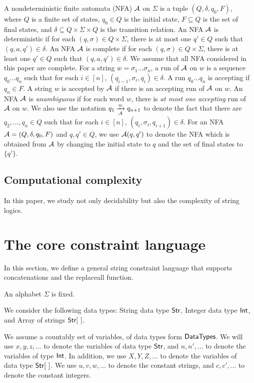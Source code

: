 A nondeterministic finite automata (NFA) $\mathcal{A}$ on $\Sigma$ is a tuple $(Q, \delta, q_0, F)$, where $Q$ is a finite set of states, $q_0 \in Q$ is the initial state, $F \subseteq Q$ is the set of final states, and $\delta \subseteq Q \times \Sigma \times Q$ is the transition relation. An NFA $\mathcal{A}$ is deterministic if for each $(q, \sigma) \in Q \times \Sigma$, there is at most one $q' \in Q$ such that $(q, a, q') \in \delta$. An NFA $\mathcal{A}$ is complete if for each $(q, \sigma) \in Q \times \Sigma$, there is at least one $q' \in Q$ such that $(q, a, q') \in \delta$. We assume that all NFA considered in this paper are complete. For a string $w = \sigma_1 \dots \sigma_n$, a run of $\mathcal{A}$ on $w$ is a sequence $q_0 \dots q_n$ such that for each $i \in [n]$, $(q_{i-1}, \sigma_i, q_i) \in \delta$. A run $q_0 \dots q_n$ is accepting if $q_n \in F$. A string $w$ is accepted by $\mathcal{A}$ if there is an accepting run of $\mathcal{A}$ on $w$. An NFA $\mathcal{A}$ is \emph{unambiguous} if for each word $w$, there is \emph{at most one accepting} run of $\mathcal{A}$ on $w$.
We also use the notation $q_1 \xrightarrow[\mathcal{A}]{w} q_{n+1}$ to denote the fact that there are $q_2,\dots, q_n \in Q$ such that for each $i \in [n]$, $(q_i, \sigma_i, q_{i+1}) \in \delta$.  For an NFA $\mathcal{A}=(Q, \delta, q_0, F)$ and $q, q' \in Q$, we use $\mathcal{A}(q,q')$ to denote the NFA which is obtained from $\mathcal{A}$ by changing the initial state to $q$ and the set of final states to $\{q'\}$.

\subsection*{Computational complexity}
In this paper, we study not only decidability but also the complexity of string logics. 


\section{The core constraint language}

In this section, we define a general string constraint language that supports concatenations and the replaceall function.  

An alphabet $\Sigma$ is fixed.

We consider the following data types: String data type ${\sf Str}$, Integer data type ${\sf Int}$, and Array of strings $\str [\ ]$.


We assume a countably set of variables, of data types form ${\sf DataTypes}$. We will use $x, y, z, \dots$ to denote the variables of data type ${\sf Str}$, and $n, n', \dots$ to denote the variables of type ${\sf Int}$. In addition, we use $X, Y, Z, \dots$ to denote the variables of data type $\str[\ ]$.
We use $u, v, w, \dots$ to denote the constant strings, and $c, c',\dots$ to denote the constant integers.


